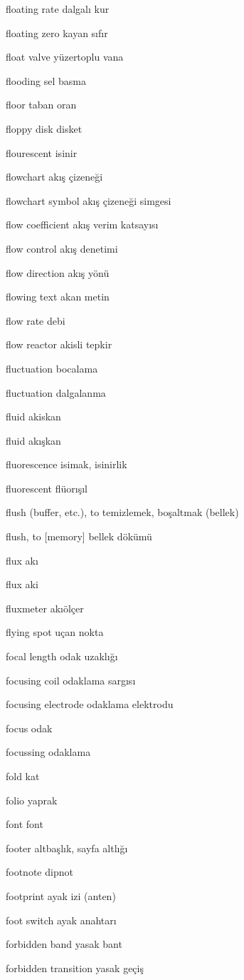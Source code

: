 \documentclass[12pt,fleqn]{article}\usepackage{../../common}
\begin{document}
floating rate dalgalı kur

floating zero kayan sıfır

float valve yüzertoplu vana

flooding sel basma

floor taban oran

floppy disk disket

flourescent isinir

flowchart akış çizeneği

flowchart symbol akış çizeneği simgesi

flow coefficient akış verim katsayısı

flow control akış denetimi

flow direction akış yönü

flowing text akan metin

flow rate debi

flow reactor akisli tepkir

fluctuation bocalama

fluctuation dalgalanma

fluid akiskan

fluid akışkan

fluorescence isimak, isinirlik

fluorescent flüorışıl

flush (buffer, etc.), to temizlemek, boşaltmak (bellek)

flush, to [memory] bellek dökümü

flux akı

flux aki

fluxmeter akıölçer

flying spot uçan nokta

focal length odak uzaklığı

focusing coil odaklama sargısı

focusing electrode odaklama elektrodu

focus odak

focussing odaklama

fold kat

folio yaprak

font font

footer altbaşlık, sayfa altlığı

footnote dipnot

footprint ayak izi (anten)

foot switch ayak anahtarı

forbidden band yasak bant

forbidden transition yasak geçiş
\end{document}
